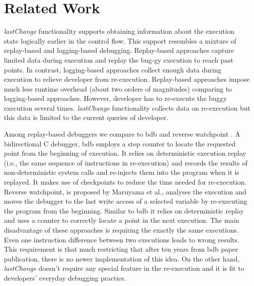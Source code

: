 \documentclass[preprint]{sigplanconf}
\begin{document}

\section{Related Work}

\textit{lastChange} functionality supports obtaining information about
the execution state logically earlier in the control flow. This
support resembles a mixture of replay-based and logging-based
debugging. Replay-based approaches capture limited data during
execution and replay the bug-gy execution to reach past points. In
contrast, logging-based approaches collect enough data during
execution to relieve developer from re-execution. Replay-based
approaches impose much less runtime overhead (about two orders of
magnitudes) comparing to logging-based approaches. However, developer
has to re-execute the buggy execution several
times. \textit{lastChange} functionality collects data on re-execution
but this data is limited to the current queries of developer.

Among replay-based debuggers we compare to bdb \cite{Boothe} and
reverse watchpoint \cite{Maruyama}.  A bidirectional C debugger, bdb
employs a step counter to locate the requested point from the
beginning of execution. It relies on deterministic execution replay
(i.e., the same sequence of instructions in re-execution) and records
the results of non-deterministic system calls and re-injects them into
the program when it is replayed. It makes use of checkpoints to reduce
the time needed for re-execution.  Reverse watchpoint, is proposed by
Maruyama et al., analyses the execution and moves the debugger to the
last write access of a selected variable by re-executing the program
from the beginning\cite{Maruyama}.  Similar to bdb it relies on deterministic
replay and uses a counter to correctly locate a point in the next
execution. The main disadvantage of these approaches is requiring the
exactly the same executions. Even one instruction difference between
two executions leads to wrong results. This requirement is that
much restricting that after ten years from bdb paper publication,
there is no newer implementation of this idea. On the other hand,
\textit{lastChange} doesn't require any special feature in the
re-execution and it is fit to  developers' everyday debugging
practice.
\end{document}
